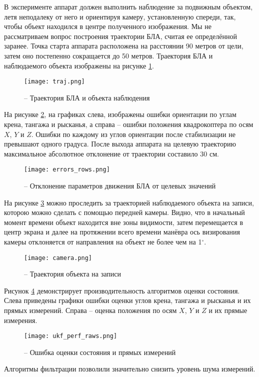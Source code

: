 В эксперименте аппарат должен выполнить наблюдение за подвижным объектом, летя неподалеку от него и ориентируя камеру, установленную спереди, так, чтобы объект находился в центре полученного изображения.
Мы не рассматриваем вопрос построения траектории БЛА, считая ее определённой заранее.
Точка старта аппарата расположена на расстоянии 90 метров от цели, затем оно постепенно сокращается до 50 метров.
Траектория БЛА и наблюдаемого объекта изображены на рисунке \ref{fig:mau_traj}.
\begin{figure}[H]
	\centering
	\texttt{[image: traj.png]}
	\caption{ -- Траектория БЛА и объекта наблюдения}
	\label{fig:mau_traj}
\end{figure}

На рисунке \ref{fig:mau_errors}, на графиках слева, изображены ошибки ориентации по углам крена, тангажа и рысканья,
а справа -- ошибки положения  квадрокоптера по осям $X$, $Y$ и $Z$.
Ошибки по каждому из углов ориентации после стабилизации не превышают одного градуса.
После выхода аппарата на целевую траекторию максимальное абсолютное отклонение от траектории составило 30 см.
\begin{figure}[H]
	\centering
	\texttt{[image: errors\_rows.png]}
	\caption{ -- Отклонение параметров движения БЛА от целевых значений}
	\label{fig:mau_errors}
\end{figure}

На рисунке \ref{fig:mau_cam} можно проследить за траекторией наблюдаемого объекта на записи, которою можно сделать с помощью передней камеры.
Видно, что в начальный момент времени объект находится вне зоны видимости, затем перемещается в центр экрана и далее на протяжении всего времени манёвра ось визирования камеры отклоняется от направления на объект не более чем на 1$^\circ$.
\begin{figure}[H]
	\centering
	\texttt{[image: camera.png]}
	\caption{ -- Траектория объекта на записи}
	\label{fig:mau_cam}
\end{figure}
Рисунок \ref{fig:mau_est} демонстрирует производительность алгоритмов оценки состояния. Слева приведены графики ошибки оценки углов крена, тангажа и рысканья и их прямых измерений. Справа – оценка положения по осям $X$, $Y$ и $Z$  и их прямые измерения.
\begin{figure}[H]
	\centering
	\texttt{[image: ukf\_perf\_raws.png]}
	\caption{ -- Ошибка оценки состояния и прямых измерений}
	\label{fig:mau_est}
\end{figure}
Алгоритмы фильтрации позволили значительно снизить уровень шума измерений.

